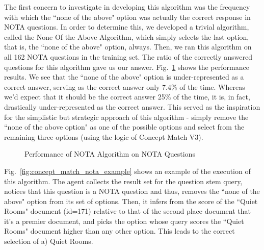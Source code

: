 The first concern to investigate in developing this algorithm was the frequency with which the ``none of the above" option was actually the correct response in NOTA questions.  In order to determine this, we developed a trivial algorithm, called the None Of the Above Algorithm, which simply selects the last option, that is, the ``none of the above" option, always.  Then, we ran this algorithm on all 162 NOTA questions in the training set.  The ratio of the correctly answered questions for this algorithm gave us our answer.  Fig.~\ref{fig:nota_training_set_performance} shows the performance results.  We see that the ``none of the above" option is under-represented as a correct answer, serving as the correct answer only 7.4\% of the time.  Whereas we'd expect that it should be the correct answer 25\% of the time, it is, in fact, drastically under-represented as the correct answer.  This served as the inspiration for the simplistic but strategic approach of this algorithm - simply remove the ``none of the above option" as one of the possible options and select from the remaining three options (using the logic of Concept Match V3).

\begin{figure}
\centering
\vspace{0.75in}
\caption{Performance of NOTA Algorithm on NOTA Questions}
\label{fig:nota_training_set_performance}
\end{figure}


Fig.~\ref{fig:concept_match_nota_example} shows an example of the execution of this algorithm.  The agent collects the result set for the question stem query, notices that this question is a NOTA question and thus, removes the ``none of the above" option from its set of options.  Then, it infers from the score of the ``Quiet Rooms" document (id=171) relative to that of the second place document that it's a premier document, and picks the option whose query scores the ``Quiet Rooms" document higher than any other option.  This leads to the correct selection of a) Quiet Rooms.


